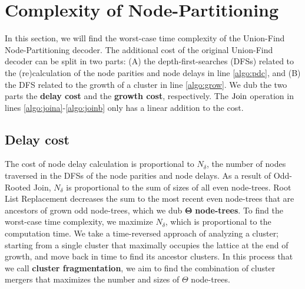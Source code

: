 
\section{Complexity of Node-Partitioning}\label{sec:complexity}

In this section, we will find the worst-case time complexity of the Union-Find Node-Partitioning decoder. The additional cost of the original Union-Find decoder can be split in two parts: (A) the depth-first-searches (DFSs) related to the (re)calculation of the node parities and node delays in line \ref{algo:pdc}, and (B) the DFS related to the growth of a cluster in line \ref{algo:grow}. We dub the two parts the \textbf{delay cost} and the \textbf{growth cost}, respectively. The $\operatorname{Join}$ operation in lines \ref{algo:joina}-\ref{algo:joinb} only has a linear addition to the cost.

\subsection{Delay cost}\label{sec:suscomplexity}

The cost of node delay calculation is proportional to $N_\delta$, the number of nodes traversed in the DFSs of the node parities and node delays. As a result of Odd-Rooted Join, $N_\delta$ is proportional to the sum of sizes of all even node-trees. Root List Replacement decreases the sum to the most recent even node-trees that are ancestors of grown odd node-trees, which we dub $\mathbf{\Theta}$ \textbf{node-trees}. To find the worst-case time complexity, we maximize $N_\delta$, which is proportional to the computation time. We take a time-reversed approach of analyzing a cluster; starting from a single cluster that maximally occupies the lattice at the end of growth, and move back in time to find its ancestor clusters. In this process that we call \textbf{cluster fragmentation}, we aim to find the combination of cluster mergers that maximizes the number and sizes of $\Theta$ node-trees. 





